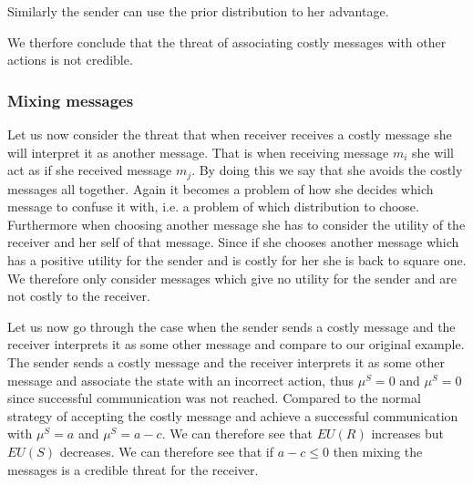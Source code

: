 \documentclass[10]{article}
\begin{document}
Similarly the sender can use the prior distribution to her advantage.

We therfore conclude that the threat of associating costly messages with other actions is not credible.

\subsubsection{Mixing messages}
Let us now consider the threat that when receiver receives a costly message she will interpret it as another message. %
That is when receiving message $m_i$ she will act as if she received message $m_j$. By doing this we say that she avoids the costly messages all together. Again it becomes a problem of how she decides which message to confuse it with, i.e. a problem of which distribution to choose. Furthermore when choosing another message she has to consider the utility of the receiver and her self of that message. Since if she chooses another message which has a positive utility for the sender and is costly for her she is back to square one. We therefore only consider messages which give no utility for the sender and are not costly to the receiver.

Let us now go through the case when the sender sends a costly message and the receiver interprets it as some other message and compare to our original example. The sender sends a costly message and the receiver interprets it as some other message and associate the state with an incorrect action, thus $\mu^S=0$ and $\mu^S=0$ since successful communication was not reached. Compared to the normal strategy of accepting the costly message and achieve a successful communication with $\mu^S=a$ and $\mu^S=a-c$. %
We can therefore see that $EU(R)$ increases but $EU(S)$ decreases. We can therefore see that if $a-c \leq 0$ then mixing the messages is a credible threat for the receiver.
\end{document}
